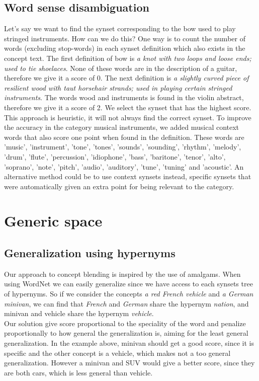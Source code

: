 
\subsection{Word sense disambiguation}
Let's say we want to find the synset corresponding to the bow used to play stringed instruments. How can we do this? One way is to count the number of words (excluding stop-words) in each synset definition which also exists in the concept text. The first definition of bow is \emph{a knot with two loops and loose ends; used to tie shoelaces}. None of these words are in the description of a guitar, therefore we give it a score of 0. The next definition is \emph{a slightly curved piece of resilient wood with taut horsehair strands; used in playing certain stringed instruments}. The words wood and instruments is found in the violin abstract, therefore we give it a score of 2. We select the synset that has the highest score. This approach is heuristic, it will not always find the correct synset.
To improve the accuracy in the category musical instruments, we added musical context words that also score one point when found in the definition. These words are 'music', 'instrument', 'tone', 'tones', 'sounds', 'sounding', 'rhythm', 'melody', 'drum', 'flute', 'percussion', 'idiophone',
'bass', 'baritone', 'tenor', 'alto', 'soprano', 'note', 'pitch', 'audio', 'auditory', 'tune', 'tuning' and 'acoustic'.
An alternative method could be to use context synsets instead, specific synsets that were automatically given an extra point for being relevant to the category.


\section{Generic space}
\subsection{Generalization using hypernyms}
Our approach to concept blending is inspired by the use of amalgams. When using WordNet we can easily generalize since we have access to each synsets tree of hypernyms. So if we consider the concepts \emph{a red French vehicle} and \emph{a German minivan}, we can find that \emph{French} and \emph{German} share the hypernym \emph{nation}, and minivan and vehicle share the hypernym \emph{vehicle}.\\
Our solution give score proportional to the speciality of the word and penalize proportionally to how general the generalization is, aiming for the least general generalization. In the example above, minivan should get a good score, since it is specific and the other concept is a vehicle, which makes not a too general generalization. However a minivan and SUV would give a better score, since they are both cars, which is less general than vehicle.
